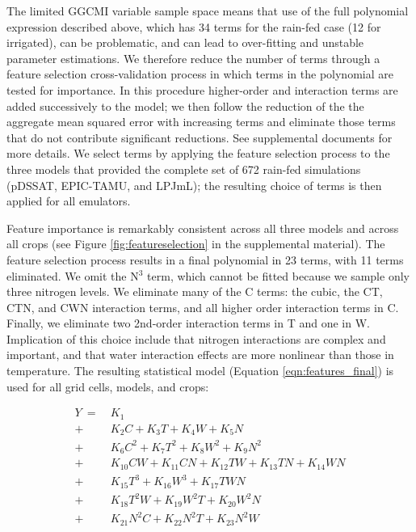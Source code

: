 \documentclass[preprint, 5p, times, twocolumn]{elsarticle}
\begin{document}
The limited GGCMI variable sample space means that use of the full polynomial expression described above, which has 34 terms for the rain-fed case (12 for irrigated), can be problematic, and can lead to over-fitting and unstable parameter estimations. We therefore reduce the number of terms through a feature selection cross-validation process in which terms in the polynomial are tested for importance. In this procedure higher-order and interaction terms are added successively to the model; we then follow the reduction of the the aggregate mean squared error with increasing terms and eliminate those terms that do not contribute significant reductions. See supplemental documents for more details. We select terms by applying the feature selection process to the three models that provided the complete set of 672 rain-fed simulations (pDSSAT, EPIC-TAMU, and LPJmL); the resulting choice of terms is then applied for all emulators. 

Feature importance is remarkably consistent across all three models and across all crops (see Figure \ref{fig:featureselection} in the supplemental material). The feature selection process results in a final polynomial in 23 terms, with 11 terms eliminated. We omit the N$^3$ term, which cannot be fitted because we sample only three nitrogen levels. We eliminate many of the C terms: the cubic, the CT, CTN, and CWN interaction terms, and all higher order interaction terms in C.  Finally, we eliminate two 2nd-order interaction terms in T and one in W. Implication of this choice include that nitrogen interactions are complex and important, and that water interaction effects are more nonlinear than those in temperature. The resulting statistical model (Equation \ref{eqn:features_final}) is used for all grid cells, models, and crops: 

\begin{align}
    \label{eqn:features_final}
    Y\ = \ & K_{1} \\
       + \ & K_{2}  C     + K_{3}  T     + K_{4} W      + K_{5}  N   \nonumber \\
       + \ & K_{6}  C^2   + K_{7}  T^2   + K_{8} W^2    + K_{9}  N^2 \nonumber \\
       + \ & K_{10} C W   + K_{11} C N   + K_{12} T W   + K_{13} T N + K_{14} W N \nonumber \\ %
       + \ & K_{15} T^3   + K_{16} W^3   + K_{17} T W N  \nonumber \\ %
       + \ & K_{18} T^2 W + K_{19} W^2 T + K_{20} W^2 N  \nonumber \\ %
       + \ & K_{21} N^2 C + K_{22} N^2 T + K_{23} N^2 W  \nonumber    %
\end{align}
\end{document}
